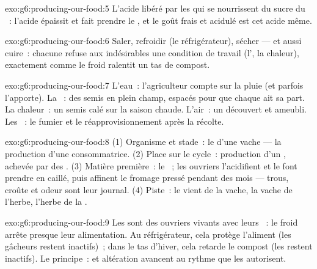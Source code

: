 \begin{solution}{exo:g6:producing-our-food:5}
L'acide libéré par les  qui se nourrissent du sucre du
~: l'acide épaissit et fait prendre le , et le goût frais et
acidulé est cet acide même.
\end{solution}

\begin{solution}{exo:g6:producing-our-food:6}
Saler, refroidir (le réfrigérateur), sécher --- et aussi cuire~:
chacune refuse aux  indésirables une condition de travail
(l', la chaleur), exactement comme le froid ralentit un tas
de compost.
\end{solution}

\begin{solution}{exo:g6:producing-our-food:7}
L'eau~: l'agriculteur compte sur la pluie (et parfois l'apporte).
La ~: des semis en plein champ, espacés pour que chaque
 ait sa part. La chaleur~: un semis calé sur la saison chaude.
L'air~: un  découvert et ameubli. Les ~: le fumier
et le réapprovisionnement après la récolte.
\end{solution}

\begin{solution}{exo:g6:producing-our-food:8}
(1) Organisme et stade~: le  d'une vache --- la production d'une
consommatrice. (2) Place sur le cycle~: production d'un
, achevée par des . (3) Matière première~: le
~; les ouvriers l'acidifient et le font prendre en caillé, puis
affinent le fromage pressé pendant des mois --- trous, croûte et
odeur sont leur journal. (4) Piste~: le  vient de la vache, la
vache de l'herbe, l'herbe de la .
\end{solution}

\begin{solution}{exo:g6:producing-our-food:9}
Les  sont des ouvriers vivants avec leurs ~: le
froid arrête presque leur alimentation. Au réfrigérateur, cela
protège l'aliment (les gâcheurs restent inactifs)~; dans le tas
d'hiver, cela retarde le compost (les  restent
inactifs). Le principe~:  et altération avancent au
rythme que les  autorisent.
\end{solution}

